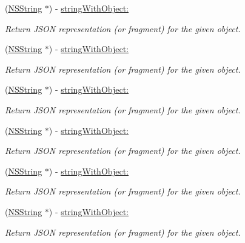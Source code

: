 \begin{DoxyCompactItemize}
\item 
(\hyperlink{class_n_s_string}{\-N\-S\-String} $\ast$) -\/ \hyperlink{protocol_s_b_json_writer-p_a675b15e830d510b7fcd72f4e0a89ec45}{string\-With\-Object\-:}
\begin{DoxyCompactList}\small\item\em \-Return \-J\-S\-O\-N representation (or fragment) for the given object. \end{DoxyCompactList}\item 
(\hyperlink{class_n_s_string}{\-N\-S\-String} $\ast$) -\/ \hyperlink{protocol_s_b_json_writer-p_a675b15e830d510b7fcd72f4e0a89ec45}{string\-With\-Object\-:}
\begin{DoxyCompactList}\small\item\em \-Return \-J\-S\-O\-N representation (or fragment) for the given object. \end{DoxyCompactList}\item 
(\hyperlink{class_n_s_string}{\-N\-S\-String} $\ast$) -\/ \hyperlink{protocol_s_b_json_writer-p_a675b15e830d510b7fcd72f4e0a89ec45}{string\-With\-Object\-:}
\begin{DoxyCompactList}\small\item\em \-Return \-J\-S\-O\-N representation (or fragment) for the given object. \end{DoxyCompactList}\item 
(\hyperlink{class_n_s_string}{\-N\-S\-String} $\ast$) -\/ \hyperlink{protocol_s_b_json_writer-p_a675b15e830d510b7fcd72f4e0a89ec45}{string\-With\-Object\-:}
\begin{DoxyCompactList}\small\item\em \-Return \-J\-S\-O\-N representation (or fragment) for the given object. \end{DoxyCompactList}\item 
(\hyperlink{class_n_s_string}{\-N\-S\-String} $\ast$) -\/ \hyperlink{protocol_s_b_json_writer-p_a675b15e830d510b7fcd72f4e0a89ec45}{string\-With\-Object\-:}
\begin{DoxyCompactList}\small\item\em \-Return \-J\-S\-O\-N representation (or fragment) for the given object. \end{DoxyCompactList}\item 
(\hyperlink{class_n_s_string}{\-N\-S\-String} $\ast$) -\/ \hyperlink{protocol_s_b_json_writer-p_a675b15e830d510b7fcd72f4e0a89ec45}{string\-With\-Object\-:}
\begin{DoxyCompactList}\small\item\em \-Return \-J\-S\-O\-N representation (or fragment) for the given object. \end{DoxyCompactList}\end{DoxyCompactItemize}
